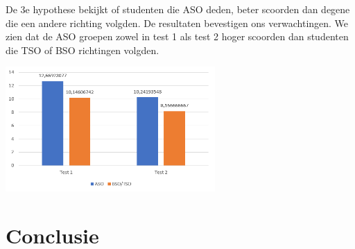 \documentclass{voorstel}
\begin{document}
    De 3e hypothese bekijkt of studenten die ASO deden, beter scoorden dan degene die een andere richting volgden. De resultaten bevestigen ons verwachtingen. We zien dat de ASO groepen zowel in test 1 als test 2 hoger scoorden dan studenten die TSO of BSO richtingen volgden.
    
    	\includegraphics[width=8cm]{img/aso.png}
    
        
    \section{Conclusie}
    \label{sec:conclusie}
	
	\printbibliography[heading=bibintoc]
	
\end{document}

